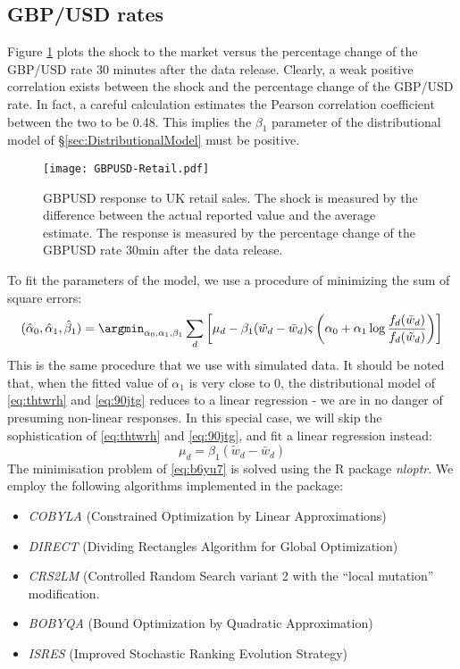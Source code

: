 \documentclass[a4paper,11pt,pdftex,twoside,titlepage]{article}
\begin{document}
\subsection{GBP/USD rates}
\label{sec:gbpusd}
Figure \ref{fig:9vrth} plots the shock to the market versus the
percentage change of the GBP/USD rate 30 minutes after the data
release. Clearly, a weak positive correlation exists between the shock
and the percentage change of the GBP/USD rate. In fact, a careful
calculation estimates the Pearson correlation coefficient between the
two to be 0.48. This implies the $\beta_1$ parameter of the
distributional model of \S\ref{sec:DistributionalModel} must be
positive.
\begin{figure}[htb!]
  \centering
  \texttt{[image: GBPUSD-Retail.pdf]}
  \caption{GBPUSD response to UK retail sales. The shock is measured
    by the difference between the actual reported value and the
    average estimate. The response is measured by the percentage
    change of the GBPUSD rate 30min after the data release.}
  \label{fig:9vrth}
\end{figure}
To fit the parameters of the model, we use a
procedure of minimizing the sum of square errors:
\begin{equation}
  \label{eq:b6yu7}
  (\hat \alpha_0, \hat \alpha_1, \hat \beta_1)
  = \argmin_{\alpha_0, \alpha_1, \beta_1}
  \sum_d \left[
    \mu_d - \beta_1  (\tilde w_d - \bar w_d)
    \varsigma\left(
      \alpha_0 + \alpha_1 \log{f_d(\bar w_d) \over f_d(\tilde w_d)}
    \right)
  \right]
\end{equation}
This is the same procedure that we use with simulated data. It should
be noted that, when the fitted value of $\alpha_1$ is very close to 0,
the distributional model of \eqref{eq:thtwrh} and \eqref{eq:90jtg}
reduces to a linear regression - we are in no danger of presuming
non-linear responses. In this special case, we will skip the
sophistication of \eqref{eq:thtwrh} and \eqref{eq:90jtg}, and fit a
linear regression instead:
\begin{equation}
  \label{eq:65tb7uk}
  \mu_d = \beta_1 (\tilde w_d - \bar w_d)  
\end{equation}
The minimisation problem of \eqref{eq:b6yu7} is solved using the R
package {\it nloptr}. We employ the following algorithms implemented
in the package:
\begin{itemize}
\item {\it COBYLA} (Constrained Optimization by Linear
  Approximations)
\item {\it DIRECT} (Dividing Rectangles Algorithm for Global
  Optimization)
  \item {\it CRS2LM} (Controlled Random Search variant 2 with the
    ``local mutation'' modification.
  \item {\it BOBYQA} (Bound Optimization by Quadratic Approximation)
  \item {\it ISRES} (Improved Stochastic Ranking Evolution Strategy)
\end{itemize}
\end{document}
